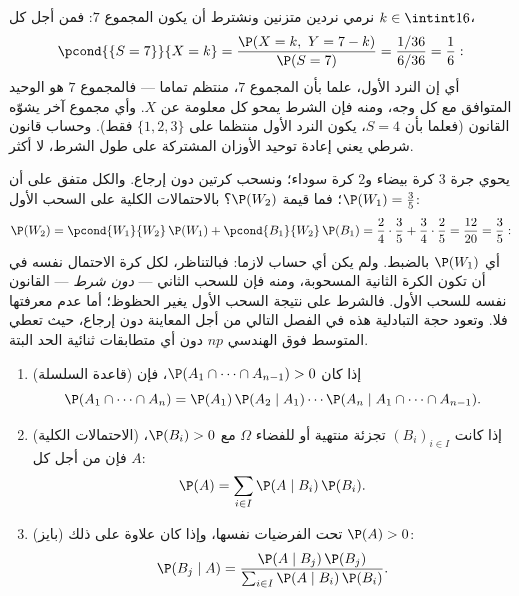 \begin{example}\label{ex:b2:proba:sumseven}
نرمي نردين متزنين ونشترط أن يكون المجموع $7$: فمن أجل كل $k \in \intint16$،
\[
\pcond{\{S = 7\}}{X = k}
= \frac{\P(X = k,\ Y = 7 - k)}{\P(S = 7)}
= \frac{1/36}{6/36} = \frac16 :
\]
أي إن النرد الأول، علما بأن المجموع $7$، منتظم تماما --- فالمجموع
$7$ هو الوحيد المتوافق مع كل وجه، ومنه فإن الشرط يمحو كل معلومة
عن $X$. وأي مجموع آخر يشوّه القانون (فعلما بأن $S = 4$، يكون
النرد الأول منتظما على $\{1, 2, 3\}$ فقط). وحساب قانون شرطي يعني إعادة توحيد
الأوزان المشتركة على طول  الشرط، لا أكثر.
\end{example}

\begin{example}\label{ex:b2:proba:seconddraw}
يحوي جرة $3$ كرة بيضاء و$2$ كرة سوداء؛ ونسحب كرتين دون
إرجاع. والكل متفق على أن $\P(W_1) = \frac35$؛ فما قيمة $\P(W_2)$؟ بالاحتمالات
الكلية على السحب الأول:
\[
\P(W_2) = \pcond{W_1}{W_2}\,\P(W_1) +
\pcond{B_1}{W_2}\,\P(B_1)
= \frac24\cdot\frac35 + \frac34\cdot\frac25
= \frac{12}{20} = \frac35 :
\]
أي $\P(W_1)$ بالضبط. ولم يكن أي حساب لازما: فبالتناظر، لكل كرة الاحتمال
نفسه في أن تكون الكرة الثانية المسحوبة، ومنه فإن للسحب الثاني ---
\emph{دون شرط} --- القانون نفسه للسحب الأول. فالشرط على نتيجة السحب
الأول يغير الحظوظ؛ أما عدم معرفتها فلا. وتعود حجة التبادلية هذه في
الفصل التالي من أجل المعاينة دون إرجاع، حيث تعطي المتوسط فوق الهندسي
$np$ دون أي متطابقات ثنائية الحد البتة.
\end{example}

\begin{theorem}\label{thm:b2:proba:bayes}
\leavevmode
\begin{enumerate}
\item (قاعدة السلسلة) إذا كان $\P(A_1 \cap \dots \cap A_{n-1}) > 0$، فإن
\[
\P(A_1 \cap \dots \cap A_n)
= \P(A_1)\,\P(A_2 \mid A_1)\cdots
\P(A_n \mid A_1 \cap \dots \cap A_{n-1}) .
\]
\item (الاحتمالات الكلية) إذا كانت $(B_i)_{i \in I}$ تجزئة منتهية أو  للفضاء $\Omega$ مع $\P(B_i) > 0$، فإن من أجل كل  $A$:
\[
\P(A) = \sum_{i \in I} \P(A \mid B_i)\,\P(B_i) .
\]
\item (بايز) تحت الفرضيات نفسها، وإذا كان علاوة على ذلك $\P(A) > 0$:
\[
\P(B_j \mid A)
= \frac{\P(A \mid B_j)\,\P(B_j)}
       {\sum_{i \in I} \P(A \mid B_i)\,\P(B_i)} .
\]
\end{enumerate}
\end{theorem}

